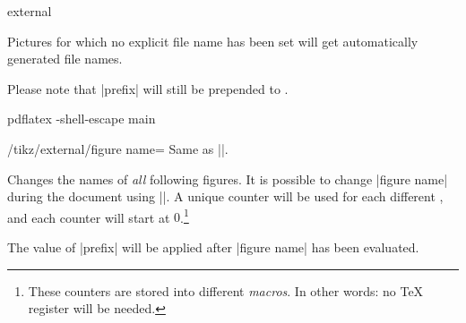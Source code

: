 {\begin{pgfplotslibrary}{external}
\begin{command}{}
        Pictures for which no explicit file name has been set will get
        automatically generated file names.

        Please note that |prefix| will still be prepended to .

\begin{codeexample}
pdflatex -shell-escape main
\end{codeexample}
    \end{command}

    \begin{key}{/tikz/external/figure name=}
        Same as ||.
    \end{key}

    \begin{command}{}
        Changes the names of \emph{all} following figures. It is possible to
        change |figure name| during the document using
        ||. A unique counter will
        be used for each different , and each counter will start at
        $0$.\footnote{These counters are stored into different \emph{macros}.
        In other words: no \TeX{} register will be needed.}

        The value of |prefix| will be applied after |figure name| has been
        evaluated.
\end{command}
\end{pgfplotslibrary}}
